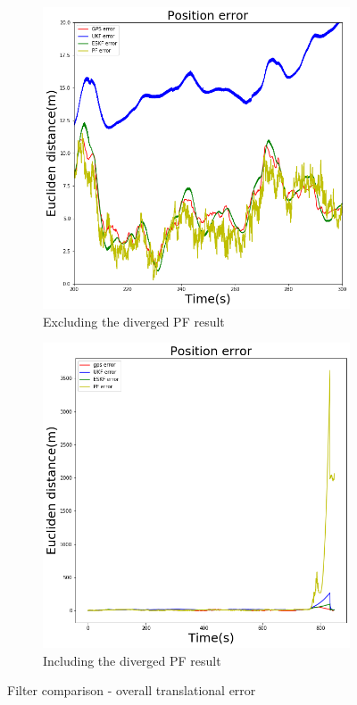 \begin{figure}[h]
    \begin{subfigure}{0.5\textwidth}
        \centering
        \includegraphics[width=1\textwidth]{figs/overall.png}
        \caption{Excluding the diverged \gls{PF} result}
    \end{subfigure}%
    \begin{subfigure}{0.5\textwidth}
        \includegraphics[width=1\textwidth]{figs/overall_diverge.png}
        \caption{Including the diverged \gls{PF} result}
    \end{subfigure}
    \caption{Filter comparison - overall translational error}
    \label{fig:ch:errorPositionOverall}
\end{figure}


